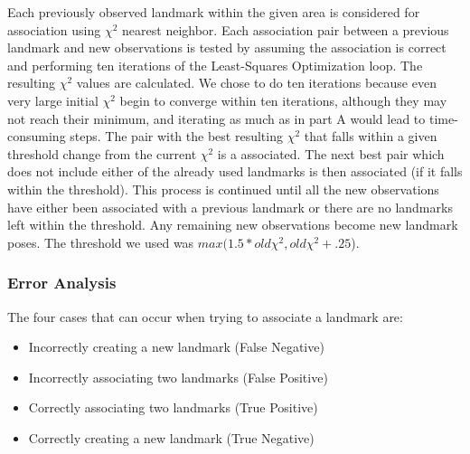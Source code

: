 \documentclass[12pt]{article}
\begin{document}
Each previously observed landmark within the given area is considered for association using $\chi^2$ nearest neighbor.  Each association pair between a previous landmark and new observations is tested by assuming the association is correct and performing ten iterations of the Least-Squares Optimization loop. The resulting $\chi^2$ values are calculated.  We chose to do ten iterations because even very large initial $\chi^2$ begin to converge within ten iterations, although they may not reach their minimum, and iterating as much as in part A would lead to time-consuming steps.  The pair with the best resulting $\chi^2$ that falls within a given threshold change from the current $\chi^2$ is a associated.  The next best pair which does not include either of the already used landmarks is then associated (if it falls within the threshold).  This process is continued until all the new observations have either been associated with a previous landmark or there are no landmarks left within the threshold.  Any remaining new observations become new landmark poses.  The threshold we used was $max(1.5*old\chi^2, old\chi^2 + .25$).


\subsubsection*{Error Analysis}

The four cases that can occur when trying to associate a landmark are:
\begin{itemize}
\item Incorrectly creating a new landmark (False Negative)
\item Incorrectly associating two landmarks (False Positive)
\item Correctly associating two landmarks (True Positive)
\item Correctly creating a new landmark (True Negative)
\end{itemize}
\end{document}
